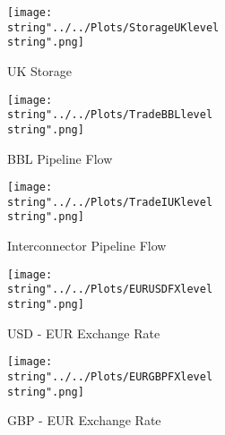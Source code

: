 \begin{figure}[ht]
  \centering
\texttt{[image: \\string"../../Plots/StorageUKlevel\\string".png]}
  \caption{UK Storage}\label{fig:StorageUKlevel}
\end{figure}

\begin{figure}[ht]
  \centering
\texttt{[image: \\string"../../Plots/TradeBBLlevel\\string".png]}
  \caption{BBL Pipeline Flow}\label{fig:TradeBBLlevel}
\end{figure}

\begin{figure}[ht]
  \centering
\texttt{[image: \\string"../../Plots/TradeIUKlevel\\string".png]}
  \caption{Interconnector Pipeline Flow}\label{fig:TradeIUKlevel}
\end{figure}

\begin{figure}[ht]
  \centering
\texttt{[image: \\string"../../Plots/EURUSDFXlevel\\string".png]}
  \caption{USD - EUR Exchange Rate}\label{fig:EURUSDFXlevel}
\end{figure}

\begin{figure}[ht]
  \centering
\texttt{[image: \\string"../../Plots/EURGBPFXlevel\\string".png]}
  \caption{GBP - EUR Exchange Rate}\label{fig:EURGBPFXlevel}
\end{figure}

\FloatBarrier